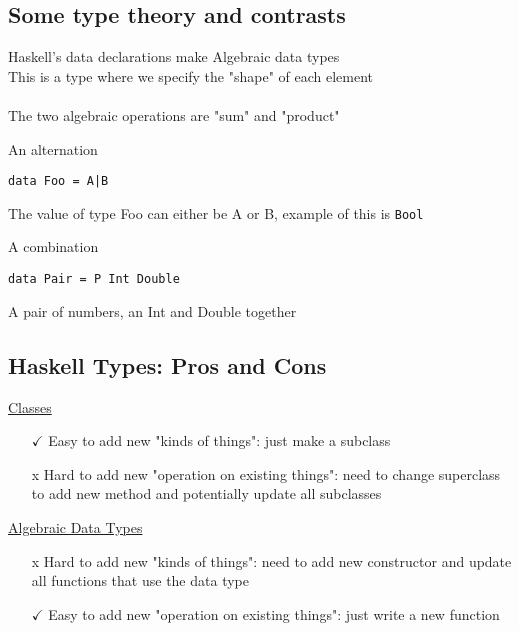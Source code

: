 \documentclass{article}[18pt]
\begin{document}
\subsection{Some type theory and contrasts}
Haskell's data declarations make Algebraic data types\\
This is a type where we specify the "shape" of each element\\
\\
The two algebraic operations are "sum" and "product"
\begin{defin}
An alternation
\begin{verbatim}
data Foo = A|B
\end{verbatim}
The value of type Foo can either be A or B, example of this is \texttt{Bool}
\end{defin}

\begin{defin}
A combination
	\begin{verbatim}
data Pair = P Int Double
	\end{verbatim}
A pair of numbers, an Int and Double together
\end{defin}
\subsection{Haskell Types: Pros and Cons}
\begin{minipage}{0.5\textwidth}
\begin{center}
\underline{Classes}
\end{center}
\begin{itemize}
	\item [$\checkmark$] Easy to add new "kinds of things": just make a subclass
	\item [x] Hard to add new "operation on existing things": need to change superclass to add new method and potentially update all subclasses
\end{itemize}
\end{minipage}
\begin{minipage}{0.5\textwidth}
\begin{center}
	\underline{Algebraic Data Types}
\end{center}
	\begin{itemize}
		\item [x] Hard to add new "kinds of things": need to add new constructor and update all functions that use the data type
		\item [$\checkmark$] Easy to add new "operation on existing things": just write a new function
	\end{itemize}
\end{minipage}
\end{document}
